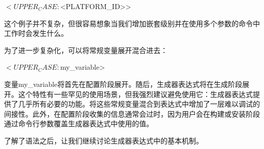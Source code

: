 \begin{shell}
$<UPPER_CASE:$<PLATFORM_ID>>
\end{shell}

这个例子并不复杂，但很容易想象当我们增加嵌套级别并在使用多个参数的命令中工作时会发生什么。

为了进一步复杂化，可以将常规变量展开混合进去：

\begin{shell}
$<UPPER_CASE:${my_variable}>
\end{shell}

变量my\_variable将首先在配置阶段展开。随后，生成器表达式将在生成阶段展开。这个特性有一些罕见的使用场景，但我强烈建议避免使用它：生成器表达式提供了几乎所有必要的功能。将这些常规变量混合到表达式中增加了一层难以调试的间接性。此外，在配置阶段收集的信息通常会过时，因为用户会在构建或安装阶段通过命令行参数覆盖生成器表达式中使用的值。

了解了语法之后，让我们继续讨论生成器表达式中的基本机制。













